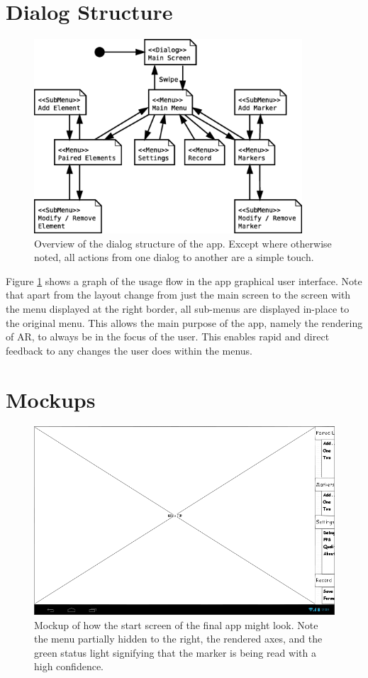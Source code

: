 \section{Dialog Structure}

\begin{figure}
	\centering
	\includegraphics[width=10cm]{img/dialogs.eps}
	\caption[App Dialog Structure.]{Overview of the dialog structure of the app. Except where otherwise noted, all actions from one dialog to another are a simple touch.}
	\label{fig:dialog_structure}
\end{figure}

Figure \ref{fig:dialog_structure} shows a graph of the usage flow in the app graphical user interface.
Note that apart from the layout change from just the main screen to the screen with the menu displayed at the right border, all sub-menus are displayed in-place to the original menu.
This allows the main purpose of the app, namely the rendering of AR, to always be in the focus of the user.
This enables rapid and direct feedback to any changes the user does within the menus.

\section{Mockups}

\begin{figure}
	\centering
	\includegraphics[width=12cm]{img/main_nomenu.png}
	\caption[Start Screen Mockup.]{Mockup of how the start screen of the final app might look. Note the menu partially hidden to the right, the rendered axes, and the green status light signifying that the marker is being read with a high confidence.}
	\label{fig:main_nomenu}
\end{figure}

